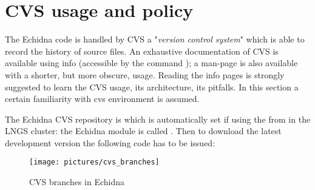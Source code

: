 \section{CVS usage and policy}
\label{sec:cvs}
The Echidna code is handled by CVS a "{\it version control system}" which is able 
to record the history of source files. An exhaustive documentation of CVS is available
using info (accessible by the command ); a man-page is also available with
a shorter, but more obscure, usage. Reading the info pages is strongly suggested to learn 
the CVS usage, its architecture, its pitfalls.
In this section a certain familiarity with cvs environment is assumed.

The Echidna CVS repository is  which is automatically set
if using the  from  in the LNGS cluster: the Echidna module is 
called . Then to download the latest development version the following code 
has to be issued:  

\begin{figure}
\begin{center}
\texttt{[image: pictures/cvs\_branches]}
\caption{CVS branches in Echidna}
\label{fig:cvs_branches}
\end{center}
\end{figure}

